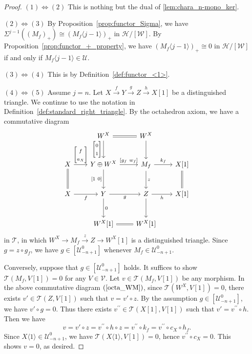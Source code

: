 \documentclass[a4paper,reqno,10pt]{amsart}
\theoremstyle{definition}
\theoremstyle{definition}
\theoremstyle{definition}
\theoremstyle{definition}
\theoremstyle{plain}
\newcommand{\CH}{\mathcal{H}}
\newcommand{\CT}{\mathcal{T}}
\newcommand{\CU}{\mathcal{U}}
\newcommand{\CV}{\mathcal{V}}
\newcommand{\CW}{\mathcal{W}}
\begin{document}
\begin{proof}
$(1)\Leftrightarrow(2)$ This is nothing but the dual of \cref{lem:chara_n-mono_ker}.

$(2)\Leftrightarrow(3)$ 
By Proposition~\ref{prop:functor_Sigma}, we have $\Sigma^{j-1}((M_f)_+)\cong (M_f\langle j-1\rangle)_+$ in $\CH/[\CW]$.
By Proposition~\ref{prop:functor_+_property}, we have 
$(M_f\langle j-1\rangle)_+\cong 0$ in $\CH/[\CW]$ if and only if $M_f\langle j-1\rangle\in\CU$.

$(3)\Leftrightarrow(4)$  This is by Definition~\ref{def:functor_<1>}.


$(4)\Leftrightarrow(5)$ Assume $j=n$. Let $X\xrightarrow{f}Y\xrightarrow{g}Z\xrightarrow{h} X[1]$ be a distinguished triangle.
We continue to use the notation in Definition~\ref{def:standard_right_triangle}. By the octahedron axiom, we have a commutative diagram
\begin{equation}\label{octa_WM}
\begin{tikzcd}[row sep=0.9cm, column sep=0.7cm]
{}
&W^X\arrow{d}[swap]{\begin{bmatrix}0\\1\end{bmatrix}}\arrow[equal]{r}{}
&W^X \arrow{d}{}
\\
X \arrow{r}{\begin{bmatrix}f\\a_X\end{bmatrix}}\arrow[equal]{d}{}
&Y\oplus W^X \arrow{d}[swap]{{[}1\ 0{]}} \arrow{r}{{[}g_f\ w_f{]}}
&M_f \arrow{r}{k_f} \arrow{d}{z}
&X[1] \arrow[equal]{d}{}
\\
X\arrow{r}[swap]{f}
&Y \arrow{d}{0} \arrow{r}[swap]{g}
&Z\arrow{r}[swap]{h}\arrow{d}{}
&X[1]
\\
{}
&W^X[1] \arrow[equal]{r}
&W^X[1]
\end{tikzcd}
\end{equation}
in $\CT$, in which $W^X\to M_f\xrightarrow{z}Z\to W^X[1]$ is a distinguished triangle. Since $g=z\circ g_f$, we have $g\in[\CU_{-n+1}^0]$ whenever $M_f\in \CU_{-n+1}^0$.

Conversely, suppose that $g\in[\CU_{-n+1}^0]$ holds. It suffices to show $\CT(M_f,V[1])=0$ for any $V\in\CV$. 
Let $v\in\CT(M_f,V[1])$ be any morphism. 
In the above commutative diagram $(\ref{octa_WM})$, %
since $\CT(W^X,V[1])=0$, there exists $v'\in\CT(Z,V[1])$ such that $v=v'\circ z$.
By the assumption $g\in [\CU_{-n+1}^0]$, we have $v'\circ g=0$. Thus there exists $v^{\prime\prime}\in\CT(X[1],V[1])$ such that $v'=v^{\prime\prime}\circ h$.
Then we have
\[
v=v'\circ z=v^{\prime\prime}\circ h\circ z=v^{\prime\prime}\circ k_f=v^{\prime\prime}\circ c_X\circ h_f. 
\]
Since $X\langle1\rangle\in\CU_{-n+1}^0$, we have $\CT(X\langle1\rangle,V[1])=0$, hence $v^{\prime\prime}\circ c_X=0$. This shows $v=0$, as desired.
\end{proof}
\end{document}
